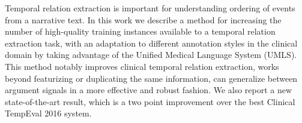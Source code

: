 Temporal relation extraction is important for understanding ordering of events from a narrative text. In this work we describe a method for increasing the number of high-quality training instances available to a temporal relation extraction task, with an adaptation to different annotation styles in the clinical domain by taking advantage of the Unified Medical Language System (UMLS). This method notably improves clinical temporal relation extraction, works beyond featurizing or duplicating the same information, can generalize between argument signals in a more effective and robust fashion. We also report a new state-of-the-art result, which is a two point improvement over the best Clinical TempEval 2016 system.
